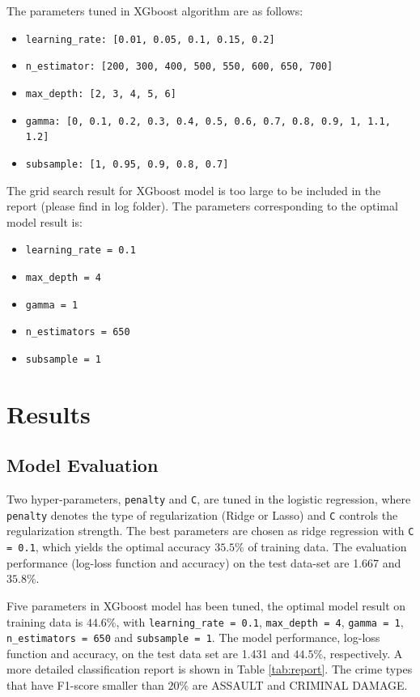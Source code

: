 \documentclass[12pt]{article}
\begin{document}
The parameters tuned in XGboost algorithm are as follows:
\begin{itemize}
\item \verb|learning_rate: [0.01, 0.05, 0.1, 0.15, 0.2]|
\item \verb|n_estimator: [200, 300, 400, 500, 550, 600, 650, 700]|
\item \verb|max_depth: [2, 3, 4, 5, 6]|
\item \verb|gamma: [0, 0.1, 0.2, 0.3, 0.4, 0.5, 0.6, 0.7, 0.8, 0.9, 1, 1.1, 1.2]| 
\item \verb|subsample: [1, 0.95, 0.9, 0.8, 0.7]|
\end{itemize}

The grid search result for XGboost model is too large to be included in the report (please find in log folder). The parameters corresponding to the optimal model result is: 
\begin{itemize}
\item \verb|learning_rate = 0.1|
\item \verb|max_depth = 4|
\item \verb|gamma = 1|
\item \verb|n_estimators = 650|
\item \verb|subsample = 1|
\end{itemize}

\section{Results}
\subsection{Model Evaluation}

Two hyper-parameters, \verb|penalty| and \verb|C|, are tuned in the logistic regression, where \verb|penalty| denotes the type of regularization (Ridge or Lasso) and \verb|C| controls the regularization strength. The best parameters are chosen as ridge regression with \verb|C = 0.1|, which yields the optimal accuracy $35.5\%$ of training data. The evaluation performance (log-loss function and accuracy) on the test data-set are 1.667 and $35.8\%$.  

Five parameters in XGboost model has been tuned, the optimal model result on training data is $44.6\%$, with \verb|learning_rate = 0.1|, \verb|max_depth = 4|, \verb|gamma = 1|, \verb|n_estimators = 650| and \verb|subsample = 1|. The model performance, log-loss function and accuracy, on the test data set are 1.431 and $44.5\%$, respectively. A more detailed classification report is shown in Table \ref{tab:report}. The crime types that have F1-score smaller than $20\%$ are ASSAULT and CRIMINAL DAMAGE.
 
\end{document}

